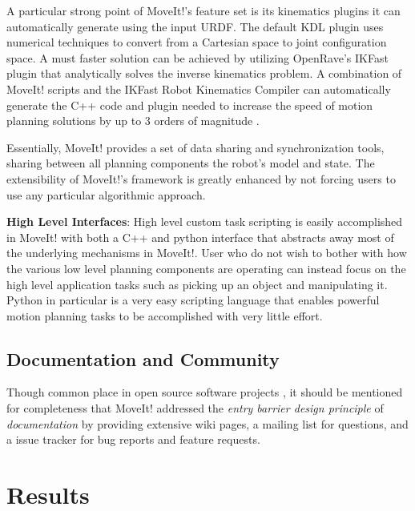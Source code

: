 \documentclass[10pt,journal,compsoc]{joser1}
\begin{document}
{A particular strong point of MoveIt!'s feature set is its kinematics plugins it can automatically generate using the input URDF. The default KDL plugin uses numerical techniques to convert from a Cartesian space to joint configuration space. A must faster solution can be achieved by utilizing OpenRave's IKFast \cite{ikfast} plugin that analytically solves the inverse kinematics problem. A combination of MoveIt! scripts and the IKFast Robot Kinematics Compiler can automatically generate the C++ code and plugin needed to increase the speed of motion planning solutions by up to 3 orders of magnitude \cite{ikfast}.

Essentially, MoveIt! provides a set of data sharing and synchronization tools, sharing between all planning components the robot's model and state. The extensibility of MoveIt!'s framework is greatly enhanced by not forcing users to use any particular algorithmic approach. 

{\bf High Level Interfaces}: High level custom task scripting is easily accomplished in MoveIt! with both a C++ and python interface that abstracts away most of the underlying mechanisms in MoveIt!. User who do not wish to bother with how the various low level planning components are operating can instead focus on the high level application tasks such as picking up an object and manipulating it. Python in particular is a very easy scripting language that enables powerful motion planning tasks to be accomplished with very little effort.

\subsection{Documentation and Community}

Though common place in open source software projects \cite{bruyninckx2001open}, it should be mentioned for completeness that MoveIt! addressed the \textit{entry barrier design principle} of \textit{documentation} by providing extensive wiki pages, a mailing list for questions, and a issue tracker for bug reports and feature requests.

\section{Results}
\label{sec::results}

}
\end{document}
